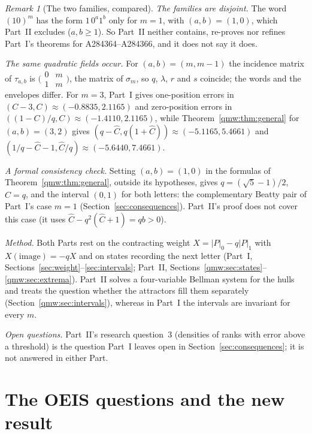 \documentclass[11pt]{article}
\numberwithin{equation}{section}
\theoremstyle{definition}
\theoremstyle{remark}
\newtheorem{remark}[theorem]{Remark}
\begin{document}
\begin{remark}[The two families, compared]\label{qmw:rem:partI}
\emph{The families are disjoint.} The word $(10)^m$ has the form
$1\,0^a1^b$ only for $m=1$, with $(a,b)=(1,0)$, which Part~II excludes
($a,b\geq1$). So Part~II neither contains, re-proves nor refines Part~I's
theorems for A284364--A284366, and it does not say it does.

\emph{The same quadratic fields occur.} For $(a,b)=(m,m-1)$ the incidence
matrix of $\tau_{a,b}$ is $\bigl(\begin{smallmatrix}0&m\\1&m\end{smallmatrix}\bigr)$,
the matrix of $\sigma_m$, so $q$, $\lambda$, $r$ and $s$ coincide; the words
and the envelopes differ. For $m=3$, Part~I gives one-position errors in
$(C-3,C)\approx(-0.8835,2.1165)$ and zero-position errors in
$((1-C)/q,C)\approx(-1.4110,2.1165)$, while Theorem~\ref{qmw:thm:general}
for $(a,b)=(3,2)$ gives $(q-\widehat C,q(1+\widehat C))\approx(-5.1165,5.4661)$
and $(1/q-\widehat C-1,\widehat C/q)\approx(-5.6440,7.4661)$.

\emph{A formal consistency check.} Setting $(a,b)=(1,0)$ in the formulas of
Theorem~\ref{qmw:thm:general}, outside its hypotheses, gives
$q=(\sqrt5-1)/2$, $\widehat C=q$, and the interval $(0,1)$ for both letters:
the complementary Beatty pair of Part~I's case $m=1$
(Section~\ref{sec:consequences}). Part~II's proof does not cover this case
(it uses $\widehat C-q^2(\widehat C+1)=qb>0$).

\emph{Method.} Both Parts rest on the contracting weight $X=|P|_0-q|P|_1$
with $X(\text{image})=-qX$ and on states recording the next letter (Part~I,
Sections~\ref{sec:weight}--\ref{sec:intervals}; Part~II,
Sections~\ref{qmw:sec:states}--\ref{qmw:sec:extrema}). Part~II solves a
four-variable Bellman system for the hulls and treats the question whether
the attractors fill them separately (Section~\ref{qmw:sec:intervals}),
whereas in Part~I the intervals are invariant for every $m$.

\emph{Open questions.} Part~II's research question~3 (densities of ranks with
error above a threshold) is the question Part~I leaves open in
Section~\ref{sec:consequences}; it is not answered in either Part.
\end{remark}

\section{The OEIS questions and the new result}\label{qmw:sec:oeis}
\end{document}

